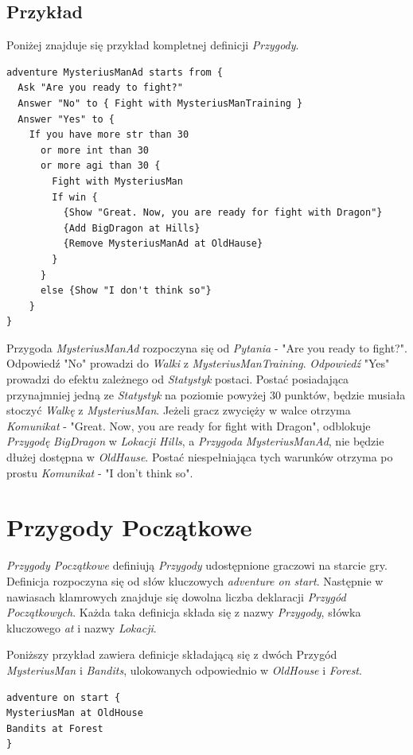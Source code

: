 \documentclass[openright]{xmgr}
\begin{document}
\subsection*{Przykład}
Poniżej znajduje się przykład kompletnej definicji \textit{Przygody}.
\begin{verbatim}
adventure MysteriusManAd starts from {
  Ask "Are you ready to fight?"
  Answer "No" to { Fight with MysteriusManTraining }
  Answer "Yes" to {
    If you have more str than 30 
      or more int than 30 
      or more agi than 30 {
        Fight with MysteriusMan
        If win {
          {Show "Great. Now, you are ready for fight with Dragon"}
          {Add BigDragon at Hills}
          {Remove MysteriusManAd at OldHause}
        }
      }
      else {Show "I don't think so"}
    }
}
\end{verbatim}
Przygoda \textit{MysteriusManAd} rozpoczyna się od \textit{Pytania} - "Are you ready to fight?". Odpowiedź "No" prowadzi do \textit{Walki} z \textit{MysteriusManTraining}.
\textit{Odpowiedź} "Yes" prowadzi do efektu zależnego od \textit{Statystyk} postaci. Postać posiadająca przynajmniej jedną ze \textit{Statystyk} na poziomie powyżej 30 punktów, będzie musiała stoczyć \textit{Walkę} z \textit{MysteriusMan}. Jeżeli gracz zwycięży w walce otrzyma \textit{Komunikat} - "Great. Now, you are ready for fight with Dragon", odblokuje \textit{Przygodę} \textit{BigDragon} w \textit{Lokacji} \textit{Hills}, a \textit{Przygoda} \textit{MysteriusManAd}, nie będzie dłużej dostępna w \textit{OldHause}. Postać niespełniająca tych warunków otrzyma po prostu \textit{Komunikat} - "I don't think so". 

\section{Przygody Początkowe} 
\textit{Przygody Początkowe} definiują \textit{Przygody} udostępnione graczowi na starcie gry. Definicja rozpoczyna się od słów kluczowych \textit{adventure on start}. Następnie w nawiasach klamrowych znajduje się dowolna liczba deklaracji \textit{Przygód Początkowych}.
Każda taka definicja składa się z nazwy \textit{Przygody}, słówka kluczowego \textit{at} i nazwy \textit{Lokacji}.

Poniższy przykład zawiera definicje składającą się z dwóch Przygód \textit{MysteriusMan} i \textit{Bandits}, ulokowanych odpowiednio w \textit{OldHouse} i \textit{Forest}.

\begin{verbatim}
adventure on start {
MysteriusMan at OldHouse
Bandits at Forest
}
\end{verbatim}
\end{document}
